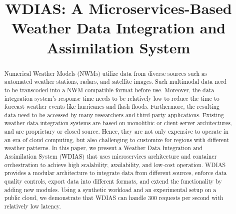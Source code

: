\documentclass[conference]{IEEEtran}
\begin{document}
\title{WDIAS: A Microservices-Based Weather Data Integration and Assimilation System\\
}

\author{
}


\maketitle

\begin{abstract}
Numerical Weather Models (NWMs) utilize data from diverse sources such as automated weather stations, radars, and satellite images. Such multimodal data need to be transcoded into a NWM compatible format before use. Moreover, the data integration system's response time needs to be relatively low to reduce the time to forecast weather events like hurricanes and flash floods. Furthermore, the resulting data need to be accessed by many researchers and third-party applications. Existing weather data integration systems are based on monolithic or client-server architectures, and are proprietary or closed source. Hence, they are not only expensive to operate in an era of cloud computing, but also challenging to customize for regions with different weather patterns. In this paper, we present a Weather Data Integration and Assimilation System (WDIAS) that uses microservices architecture and container orchestration to achieve high scalability, availability, and low-cost operation. WDIAS provides a modular architecture to integrate data from different sources, enforce data quality controls, export data into different formats, and extend the functionality by adding new modules. Using a synthetic workload and an experimental setup on a public cloud, we demonstrate that WDIAS can handle 300 requests per second with relatively low latency.
\end{abstract}
\end{document}
